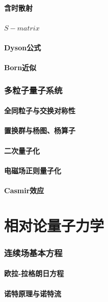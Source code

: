 \documentclass[a4paper,11pt]{article}
\begin{document}
\subsection{含时散射}
\subsection{$S-matrix$}
\subsection{Dyson公式}
\subsection{Born近似}
\section{多粒子量子系统}
\subsection{全同粒子与交换对称性}
\subsection{置换群与杨图、杨算子}
\subsection{二次量子化}
\subsection{电磁场正则量子化}
\subsection{Casmir效应}
\part{相对论量子力学}
\section{连续场基本方程}
\subsection{欧拉-拉格朗日方程}
\subsection{诺特原理与诺特流}
\end{document}
